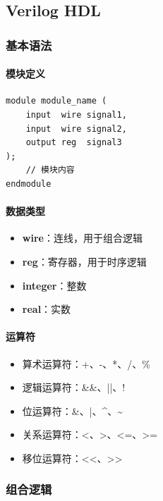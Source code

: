 \subsection{Verilog HDL}

\subsubsection{基本语法}

\paragraph{模块定义}

\begin{verbatim}
module module_name (
    input  wire signal1,
    input  wire signal2,
    output reg  signal3
);
    // 模块内容
endmodule
\end{verbatim}

\paragraph{数据类型}

\begin{itemize}
  \item \textbf{wire}：连线，用于组合逻辑
  \item \textbf{reg}：寄存器，用于时序逻辑
  \item \textbf{integer}：整数
  \item \textbf{real}：实数
\end{itemize}

\paragraph{运算符}

\begin{itemize}
  \item 算术运算符：+、-、*、/、\%
  \item 逻辑运算符：\&\&、||、!
  \item 位运算符：\&、|、\textasciicircum、\textasciitilde
  \item 关系运算符：<、>、<=、>=
  \item 移位运算符：<<、>>
\end{itemize}

\subsubsection{组合逻辑}

